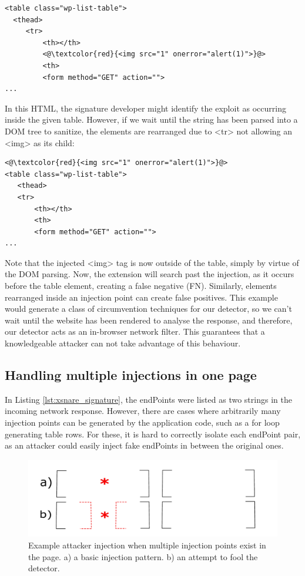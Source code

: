 \begin{lstlisting}
<table class="wp-list-table">
  <thead>
     <tr>
	     <th></th>
	     <@\textcolor{red}{<img src="1" onerror="alert(1)">}@>
	     <th>
   	     <form method="GET" action="">
...
\end{lstlisting}

In this HTML, the signature developer might identify the exploit as occurring inside the given table. However, if we wait until the string has been parsed into a DOM tree to sanitize, the elements are rearranged due to <tr> not allowing an <img> as its child:

\begin{lstlisting}
<@\textcolor{red}{<img src="1" onerror="alert(1)">}@>
<table class="wp-list-table">
   <thead>
   <tr>
	   <th></th>
	   <th>
       <form method="GET" action="">
...
\end{lstlisting}

Note that the injected <img> tag is now outside of the table, simply by virtue of the DOM parsing. Now, the extension will search past the injection, as it occurs before the table element, creating a false negative (FN). Similarly, elements rearranged inside an injection point can create false positives. This example would generate a class of circumvention techniques for our detector, so we can't wait until the website has been rendered to analyse the response, and therefore, our detector acts as an in-browser network filter. This guarantees that a knowledgeable attacker can not take advantage of this behaviour.

\subsection{Handling multiple injections in one page} \label{multiple_injections}
In Listing \ref{lst:xsnare_signature}, the endPoints were listed as two strings in the incoming network response. However, there are cases where arbitrarily many injection points can be generated by the application code, such as a for loop generating table rows. For these, it is hard to correctly isolate each endPoint pair, as an attacker could easily inject fake endPoints in between the original ones.

\begin{figure}[h]
	\includegraphics[scale=0.25]{img/attacker_injection_compound.pdf}
	\caption{Example attacker injection when multiple injection points exist in the page. a) a basic injection pattern. b) an attempt to fool the detector.}
	\label{fig:attacker_injection}
\end{figure}

